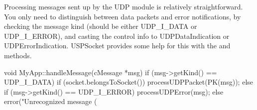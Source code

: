 
Processing messages sent up by the UDP module is relatively straightforward.
You only need to distinguish between data packets and error notifications,
by checking the message kind (should be either UDP\_I\_DATA or UDP\_I\_ERROR),
and casting the control info to UDPDataIndication or UDPErrorIndication.
USPSocket provides some help for this with the  and
 methods.

\begin{cpp}
void MyApp::handleMessage(cMessage *msg)
{
    if (msg->getKind() == UDP_I_DATA)
    {
        if (socket.belongsToSocket())
            processUDPPacket(PK(msg));
    }
    else if (msg->getKind() == UDP_I_ERROR)
    {
        processUDPError(msg);
    }
    else
    {
        error("Unrecognized message (%
    }
}
\end{cpp}

\fi



